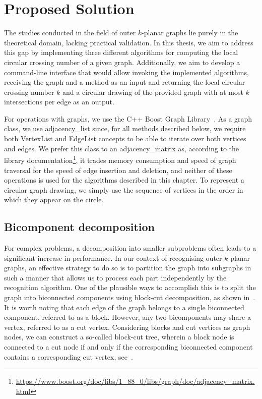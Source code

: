 \chapter{Proposed Solution}\label{ch:proposed-solution}

The studies conducted in the field of outer \(k\)-planar graphs lie purely in the theoretical domain, lacking practical validation. In this thesis, we aim to address this gap by implementing three different algorithms for computing the local circular crossing number of a given graph. Additionally, we aim to develop a command-line interface that would allow invoking the implemented algorithms, receiving the graph and a method as an input and returning the local circular crossing number \(k\) and a circular drawing of the provided graph with at most \(k\) intersections per edge as an output.

For operations with graphs, we use the C++ Boost Graph Library~\cite{boost}. As a graph class, we use \textsf{adjacency\_list} since, for all methods described below, we require both \textsf{VertexList} and \textsf{EdgeList} concepts to be able to iterate over both vertices and edges. We prefer this class to an \textsf{adjacency\_matrix} as, according to the library documentation\footnote{\url{https://www.boost.org/doc/libs/1_88_0/libs/graph/doc/adjacency_matrix.html}}, it trades memory consumption and speed of graph traversal for the speed of edge insertion and deletion, and neither of these operations is used for the algorithms described in this chapter. To represent a circular graph drawing, we simply use the sequence of vertices in the order in which they appear on the circle.


\section{Bicomponent decomposition}

For complex problems, a decomposition into smaller subproblems often leads to a significant increase in performance. In our context of recognising outer \(k\)-planar graphs, an effective strategy to do so is to partition the graph into subgraphs in such a manner that allows us to process each part independently by the recognition algorithm. One of the plausible ways to accomplish this is to split the graph into biconnected components using block-cut decomposition, as shown in~. It is worth noting that each edge of the graph belongs to a single biconnected component, referred to as a block. However, any two bicomponents may share a vertex, referred to as a cut vertex. Considering blocks and cut vertices as graph nodes, we can construct a so-called block-cut tree, wherein a block node is connected to a cut node if and only if the corresponding biconnected component contains a corresponding cut vertex, see~.

